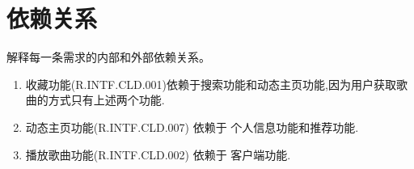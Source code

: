 \chapter{依赖关系}

解释每一条需求的内部和外部依赖关系。

\begin{enumerate}
	\item 收藏功能(R.INTF.CLD.001)依赖于搜索功能和动态主页功能,因为用户获取歌曲的方式只有上述两个功能.
	
	\item 动态主页功能(R.INTF.CLD.007) 依赖于 个人信息功能和推荐功能.
	
	\item 播放歌曲功能(R.INTF.CLD.002) 依赖于 客户端功能.
	
\end{enumerate}
